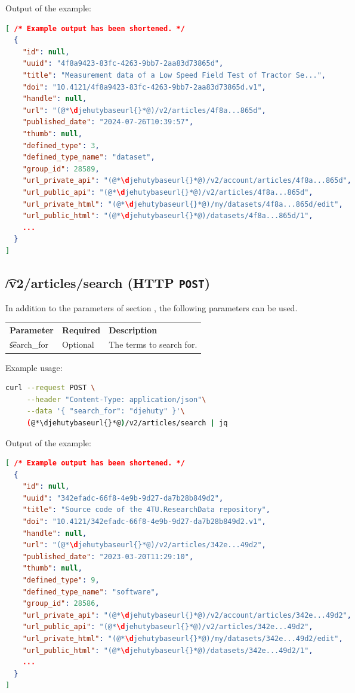   Output of the example:
\begin{lstlisting}[language=JSON]
[ /* Example output has been shortened. */
  {
    "id": null,
    "uuid": "4f8a9423-83fc-4263-9bb7-2aa83d73865d",
    "title": "Measurement data of a Low Speed Field Test of Tractor Se...",
    "doi": "10.4121/4f8a9423-83fc-4263-9bb7-2aa83d73865d.v1",
    "handle": null,
    "url": "(@*\djehutybaseurl{}*@)/v2/articles/4f8a...865d",
    "published_date": "2024-07-26T10:39:57",
    "thumb": null,
    "defined_type": 3,
    "defined_type_name": "dataset",
    "group_id": 28589,
    "url_private_api": "(@*\djehutybaseurl{}*@)/v2/account/articles/4f8a...865d",
    "url_public_api": "(@*\djehutybaseurl{}*@)/v2/articles/4f8a...865d",
    "url_private_html": "(@*\djehutybaseurl{}*@)/my/datasets/4f8a...865d/edit",
    "url_public_html": "(@*\djehutybaseurl{}*@)/datasets/4f8a...865d/1",
    ...
  }
]
\end{lstlisting}

\subsection{\t{/v2/articles/search} (HTTP \texttt{POST})}

  In addition to the parameters of section , the
  following parameters can be used.

\begin{tabularx}{\textwidth}{*{2}{!{\VRule[-1pt]}l}!{\VRule[-1pt]}X}
  \headrow
  \textbf{Parameter}   & \textbf{Required} & \textbf{Description}\\
  \t{search\_for}      & Optional & The terms to search for.
\end{tabularx}

  Example usage:
\begin{lstlisting}[language=bash]
curl --request POST \
     --header "Content-Type: application/json"\
     --data '{ "search_for": "djehuty" }'\
     (@*\djehutybaseurl{}*@)/v2/articles/search | jq
\end{lstlisting}

  Output of the example:
\begin{lstlisting}[language=JSON]
[ /* Example output has been shortened. */
  {
    "id": null,
    "uuid": "342efadc-66f8-4e9b-9d27-da7b28b849d2",
    "title": "Source code of the 4TU.ResearchData repository",
    "doi": "10.4121/342efadc-66f8-4e9b-9d27-da7b28b849d2.v1",
    "handle": null,
    "url": "(@*\djehutybaseurl{}*@)/v2/articles/342e...49d2",
    "published_date": "2023-03-20T11:29:10",
    "thumb": null,
    "defined_type": 9,
    "defined_type_name": "software",
    "group_id": 28586,
    "url_private_api": "(@*\djehutybaseurl{}*@)/v2/account/articles/342e...49d2",
    "url_public_api": "(@*\djehutybaseurl{}*@)/v2/articles/342e...49d2",
    "url_private_html": "(@*\djehutybaseurl{}*@)/my/datasets/342e...49d2/edit",
    "url_public_html": "(@*\djehutybaseurl{}*@)/datasets/342e...49d2/1",
    ...
  }
]
\end{lstlisting}


